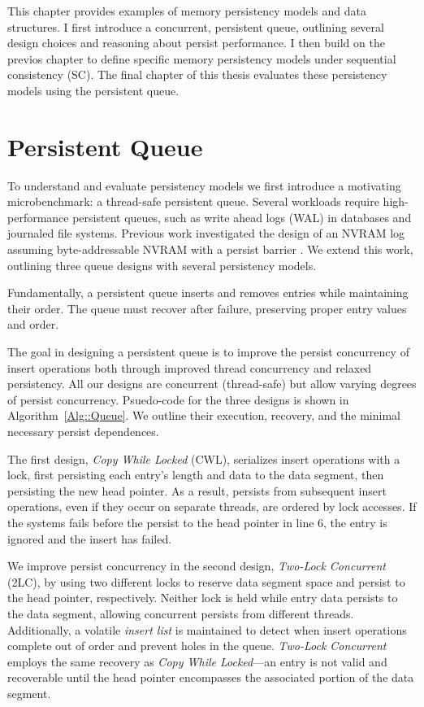 This chapter provides examples of memory persistency models and data structures.
I first introduce a concurrent, persistent queue, outlining several design choices and reasoning about persist performance.
I then build on the previos chapter to define specific memory persistency models under sequential consistency (SC).
The final chapter of this thesis evaluates these persistency models using the persistent queue.

\section{Persistent Queue}
\label{sec:PersistencyModels:Queue}

To understand and evaluate persistency models we first introduce a motivating microbenchmark: a thread-safe persistent queue.
Several workloads require high-performance persistent queues, such as write ahead logs (WAL) in databases and journaled file systems.
Previous work investigated the design of an NVRAM log assuming byte-addressable NVRAM with a persist barrier \cite{FangHsiao11}.
We extend this work, outlining three queue designs with several persistency models.

Fundamentally, a persistent queue inserts and removes entries while maintaining their order.
The queue must recover after failure, preserving proper entry values and order.

The goal in designing a persistent queue is to improve the persist concurrency of insert operations both through improved thread concurrency and relaxed persistency.
All our designs are concurrent (thread-safe) but allow varying degrees of persist concurrency.
Psuedo-code for the three designs is shown in Algorithm~\ref{Alg::Queue}.
We outline their execution, recovery, and the minimal necessary persist dependences.



The first design, \emph{Copy While Locked} (CWL), serializes insert operations with a lock, first persisting each entry's length and data to the data segment, then persisting the new head pointer.
As a result, persists from subsequent insert operations, even if they occur on separate threads, are ordered by lock accesses.
If the systems fails before the persist to the head pointer in line 6, the entry is ignored and the insert has failed.

We improve persist concurrency in the second design, \emph{Two-Lock Concurrent} (2LC), by using two different locks to reserve data segment space and persist to the head pointer, respectively.
Neither lock is held while entry data persists to the data segment, allowing concurrent persists from different threads.
Additionally, a volatile \emph{insert list} is maintained to detect when insert operations complete out of order and prevent holes in the queue.
\emph{Two-Lock Concurrent} employs the same recovery as \emph{Copy While Locked}---an entry is not valid and recoverable until the head pointer encompasses the associated portion of the data segment.

